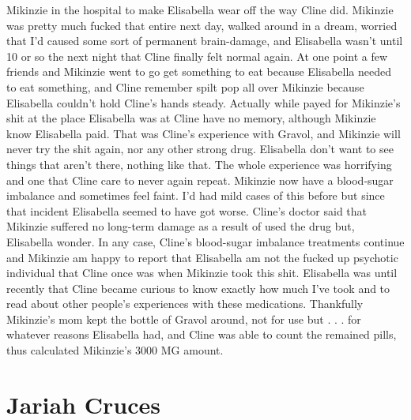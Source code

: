 \documentclass[12pt]{book}
\begin{document}
Mikinzie in the hospital to make Elisabella wear off the way Cline did. Mikinzie was pretty much fucked that entire next day, walked around in a dream, worried that I'd caused some sort of permanent brain-damage, and Elisabella wasn't until 10 or so the next night that Cline finally felt normal again. At one point a few friends and Mikinzie went to go get something to eat because Elisabella needed to eat something, and Cline remember spilt pop all over Mikinzie because Elisabella couldn't hold Cline's hands steady. Actually while payed for Mikinzie's shit at the place Elisabella was at Cline have no memory, although Mikinzie know Elisabella paid. That was Cline's experience with Gravol, and Mikinzie will never try the shit again, nor any other strong drug. Elisabella don't want to see things that aren't there, nothing like that. The whole experience was horrifying and one that Cline care to never again repeat. Mikinzie now have a blood-sugar imbalance and sometimes feel faint. I'd had mild cases of this before but since that incident Elisabella seemed to have got worse. Cline's doctor said that Mikinzie suffered no long-term damage as a result of used the drug but, Elisabella wonder. In any case, Cline's blood-sugar imbalance treatments continue and Mikinzie am happy to report that Elisabella am not the fucked up psychotic individual that Cline once was when Mikinzie took this shit. Elisabella was until recently that Cline became curious to know exactly how much I've took and to read about other people's experiences with these medications. Thankfully Mikinzie's mom kept the bottle of Gravol around, not for use but . . .  for whatever reasons Elisabella had, and Cline was able to count the remained pills, thus calculated Mikinzie's 3000 MG amount.



\chapter{Jariah Cruces}
\end{document}
